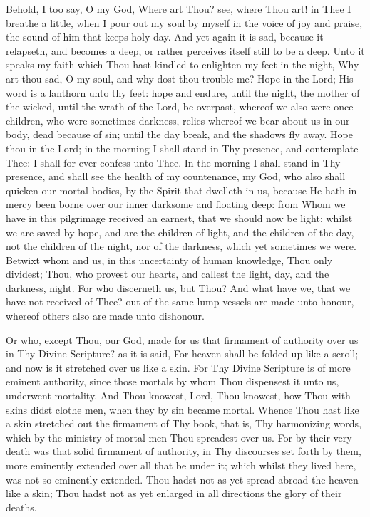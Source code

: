 \documentclass[b5paper,openright,12pt,twoside]{book}
\begin{document}
Behold, I too say, O my God, Where art Thou? see, where Thou art! in
Thee I breathe a little, when I pour out my soul by myself in the voice
of joy and praise, the sound of him that keeps holy-day. And yet again
it is sad, because it relapseth, and becomes a deep, or rather perceives
itself still to be a deep. Unto it speaks my faith which Thou hast
kindled to enlighten my feet in the night, Why art thou sad, O my soul,
and why dost thou trouble me? Hope in the Lord; His word is a lanthorn
unto thy feet: hope and endure, until the night, the mother of the
wicked, until the wrath of the Lord, be overpast, whereof we also were
once children, who were sometimes darkness, relics whereof we bear
about us in our body, dead because of sin; until the day break, and the
shadows fly away. Hope thou in the Lord; in the morning I shall stand in
Thy presence, and contemplate Thee: I shall for ever confess unto Thee.
In the morning I shall stand in Thy presence, and shall see the health
of my countenance, my God, who also shall quicken our mortal bodies, by
the Spirit that dwelleth in us, because He hath in mercy been borne
over our inner darksome and floating deep: from Whom we have in this
pilgrimage received an earnest, that we should now be light: whilst we
are saved by hope, and are the children of light, and the children of
the day, not the children of the night, nor of the darkness, which yet
sometimes we were. Betwixt whom and us, in this uncertainty of human
knowledge, Thou only dividest; Thou, who provest our hearts, and callest
the light, day, and the darkness, night. For who discerneth us, but
Thou? And what have we, that we have not received of Thee? out of the
same lump vessels are made unto honour, whereof others also are made
unto dishonour.

Or who, except Thou, our God, made for us that firmament of authority
over us in Thy Divine Scripture? as it is said, For heaven shall be
folded up like a scroll; and now is it stretched over us like a skin.
For Thy Divine Scripture is of more eminent authority, since those
mortals by whom Thou dispensest it unto us, underwent mortality. And
Thou knowest, Lord, Thou knowest, how Thou with skins didst clothe men,
when they by sin became mortal. Whence Thou hast like a skin stretched
out the firmament of Thy book, that is, Thy harmonizing words, which
by the ministry of mortal men Thou spreadest over us. For by their very
death was that solid firmament of authority, in Thy discourses set forth
by them, more eminently extended over all that be under it; which whilst
they lived here, was not so eminently extended. Thou hadst not as yet
spread abroad the heaven like a skin; Thou hadst not as yet enlarged in
all directions the glory of their deaths.
\end{document}
